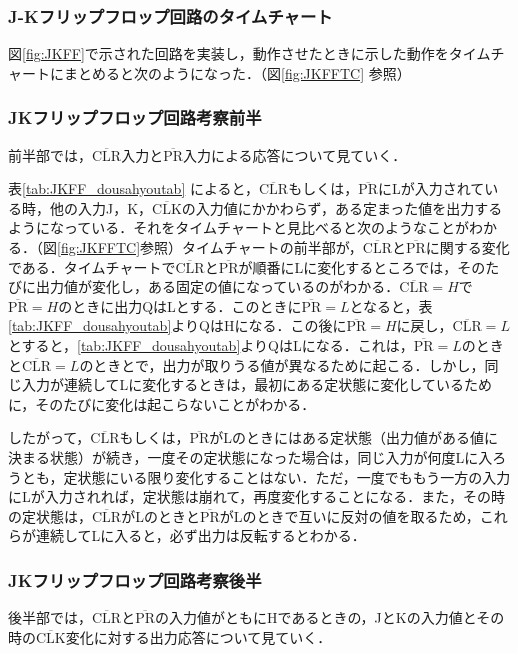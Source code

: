 %
%
\subsubsection{J-Kフリップフロップ回路のタイムチャート}
\label{JKFF_explain}
図\ref{fig:JKFF}で示された回路を実装し，動作させたときに示した動作をタイムチャートにまとめると次のようになった．（図\ref{fig:JKFFTC} 参照）

%
%
\subsubsection{JKフリップフロップ回路考察前半}
\label{JKFF_consideration3}
前半部では，$\overline{\mathrm{CLR}}$入力と$\overline{\mathrm{PR}}$入力による応答について見ていく．

表\ref{tab:JKFF_dousahyoutab} によると，$\overline{\mathrm{CLR}}$もしくは，$\overline{\mathrm{PR}}$にLが入力されている時，他の入力J，K，$\overline{\mathrm{CLK}}$の入力値にかかわらず，ある定まった値を出力するようになっている．それをタイムチャートと見比べると次のようなことがわかる．（図\ref{fig:JKFFTC}参照）タイムチャートの前半部が，$\overline{\mathrm{CLR}}$と$\overline{\mathrm{PR}}$に関する変化である．タイムチャートで$\overline{\mathrm{CLR}}$と$\overline{\mathrm{PR}}$が順番にLに変化するところでは，そのたびに出力値が変化し，ある固定の値になっているのがわかる．$\overline{\mathrm{CLR}}=H$で$\overline{\mathrm{PR}}=H$のときに出力QはLとする．このときに$\overline{\mathrm{PR}}=L$となると，表\ref{tab:JKFF_dousahyoutab}よりQはHになる．この後に$\overline{\mathrm{PR}}=H$に戻し，$\overline{\mathrm{CLR}}=L$とすると，\ref{tab:JKFF_dousahyoutab}よりQはLになる．これは，$\overline{\mathrm{PR}}=L$のときと$\overline{\mathrm{CLR}}=L$のときとで，出力が取りうる値が異なるために起こる．しかし，同じ入力が連続してLに変化するときは，最初にある定状態に変化しているために，そのたびに変化は起こらないことがわかる．

したがって，$\overline{\mathrm{CLR}}$もしくは，$\overline{\mathrm{PR}}$がLのときにはある定状態（出力値がある値に決まる状態）が続き，一度その定状態になった場合は，同じ入力が何度Lに入ろうとも，定状態にいる限り変化することはない．ただ，一度でももう一方の入力にLが入力されれば，定状態は崩れて，再度変化することになる．また，その時の定状態は，$\overline{\mathrm{CLR}}$がLのときと$\overline{\mathrm{PR}}$がLのときで互いに反対の値を取るため，これらが連続してLに入ると，必ず出力は反転するとわかる．

%
%
\subsubsection{JKフリップフロップ回路考察後半}
\label{JKFF_consideration3}
後半部では，$\overline{\mathrm{CLR}}$と$\overline{\mathrm{PR}}$の入力値がともにHであるときの，JとKの入力値とその時の$\overline{\mathrm{CLK}}$変化に対する出力応答について見ていく．

